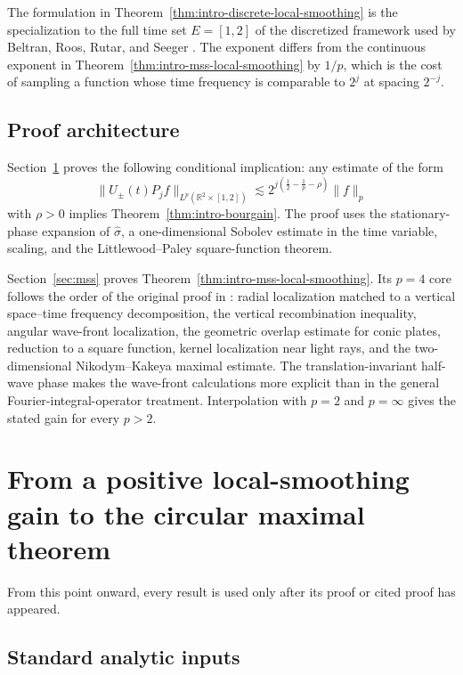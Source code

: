 \documentclass[11pt]{article}
\numberwithin{equation}{section}
\theoremstyle{definition}
\theoremstyle{remark}
\newcommand{\R}{\mathbb R}
\begin{document}
The formulation in Theorem~\ref{thm:intro-discrete-local-smoothing} is the specialization to the full time set $E=[1,2]$ of the discretized framework used by Beltran, Roos, Rutar, and Seeger \cite{BRRS2025}.  The exponent differs from the continuous exponent in Theorem~\ref{thm:intro-mss-local-smoothing} by $1/p$, which is the cost of sampling a function whose time frequency is comparable to $2^j$ at spacing $2^{-j}$.

\subsection*{Proof architecture}

Section~\ref{sec:conditional} proves the following conditional implication: any estimate of the form
\[
\|U_\pm(t)P_jf\|_{L^p(\R^2\times[1,2])}
\lesssim 2^{j(\frac12-\frac1p-\rho)}\|f\|_p
\]
with $\rho>0$ implies Theorem~\ref{thm:intro-bourgain}.  The proof uses the stationary-phase expansion of $\widehat\sigma$, a one-dimensional Sobolev estimate in the time variable, scaling, and the Littlewood--Paley square-function theorem.

Section~\ref{sec:mss} proves Theorem~\ref{thm:intro-mss-local-smoothing}.  Its $p=4$ core follows the order of the original proof in \cite[Section~1]{MSS1992}: radial localization matched to a vertical space--time frequency decomposition, the vertical recombination inequality, angular wave-front localization, the geometric overlap estimate for conic plates, reduction to a square function, kernel localization near light rays, and the two-dimensional Nikodym--Kakeya maximal estimate.  The translation-invariant half-wave phase makes the wave-front calculations more explicit than in the general Fourier-integral-operator treatment.  Interpolation with $p=2$ and $p=\infty$ gives the stated gain for every $p>2$.

\section{From a positive local-smoothing gain to the circular maximal theorem}\label{sec:conditional}

From this point onward, every result is used only after its proof or cited proof has appeared.

\subsection{Standard analytic inputs}
\end{document}
